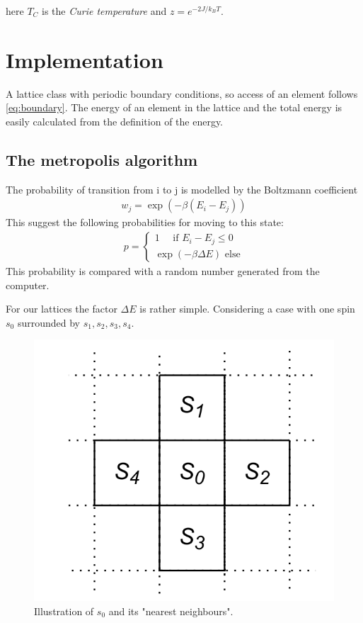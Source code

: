 \documentclass[11pt,a4paper,english]{article}
\numberwithin{equation}{section}
\begin{document}
here $T_C$ is the \emph{Curie temperature} and $z = e^{-2J/k_B T}$. 

\section{Implementation}

A lattice class with periodic boundary conditions, so access of an
element follows \eqref{eq:boundary}. The energy of an element in the 
lattice and the total energy is easily calculated from the definition
of the energy. 

\subsection{The metropolis algorithm}

The probability of transition from i to j 
is modelled by the Boltzmann coefficient
\begin{gather}
w_j = \exp(-\beta (E_i - E_j))
\end{gather}
This suggest the following probabilities for moving to this state:
\begin{gather}
p = \begin{cases}
1 \quad\text{ if }  E_i - E_j \le 0\\
\exp(-\beta \Delta E) \text{ else}
\end{cases}
\label{eq:transition}
\end{gather}
This probability is compared with a random number generated from 
the computer.

For our lattices the factor $\Delta E$ is rather simple. Considering 
a case with one spin $s_0$ surrounded by $s_1,s_2,s_3, s_4$. 

\begin{figure}[H]
\centering
\includegraphics[scale=0.2]{pics/full_lattice.png}
\caption{ Illustration of $s_0$ and its "nearest neighbours".}
\label{fig:spin_neighbours}
\end{figure}
\end{document}

